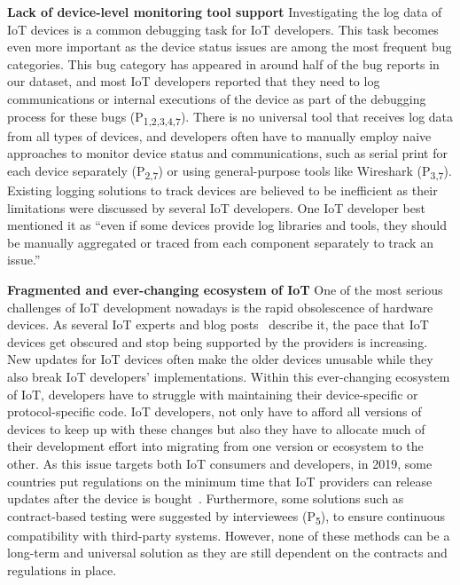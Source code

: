 \textbf{Lack of device-level monitoring tool support}
Investigating the log data of IoT devices is a common debugging task for IoT developers. This task becomes even more important as the device status issues are among the most frequent bug categories. This bug category has appeared in around half of the bug reports in our dataset, and most IoT developers reported that they need to log communications or internal executions of the device as part of the debugging process for these bugs (P\textsubscript{1,2,3,4,7}). There is no universal tool that receives log data from all types of devices, and developers often have to manually employ naive approaches to monitor device status and communications, such as serial print for each device separately (P\textsubscript{2,7}) or using general-purpose tools like Wireshark (P\textsubscript{3,7}). Existing logging solutions to track devices are believed to be inefficient as their limitations were discussed by several IoT developers. One IoT developer best mentioned it as \enquote{even if some devices provide log libraries and tools, they should be manually aggregated or traced from each component separately to track an issue.} 

\textbf{Fragmented and ever-changing ecosystem of IoT}
One of the most serious challenges of IoT development nowadays is the rapid obsolescence of hardware devices. As several IoT experts and blog posts~\cite{gizmodoblogpost,iotforallblogpost} describe it, the pace that IoT devices get obscured and stop being supported by the providers is increasing. New updates for IoT devices often make the older devices unusable while they also break IoT developers' implementations. Within this ever-changing ecosystem of IoT, developers have to struggle with maintaining their device-specific or protocol-specific code. IoT developers, not only have to afford all versions of devices to keep up with these changes but also they have to allocate much of their development effort into migrating from one version or ecosystem to the other. As this issue targets both IoT consumers and developers, in 2019, some countries put regulations on the minimum time that IoT providers can release updates after the device is bought~\cite{UKregulations}. Furthermore, some solutions such as contract-based testing were suggested by interviewees (P\textsubscript{5}), to ensure continuous compatibility with third-party systems. However, none of these methods can be a long-term and universal solution as they are still dependent on the contracts and regulations in place.




\endinput


